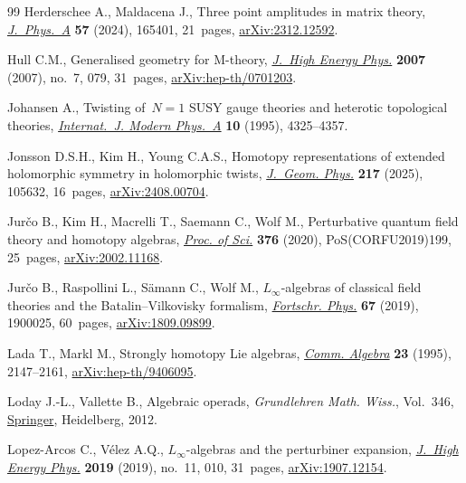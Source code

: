 \documentclass[10pt,a4paper]{amsart}
\numberwithin{equation}{section}
\theoremstyle{definition}
\begin{document}
\begin{thebibliography}{99}
Herderschee A., Maldacena J., Three point amplitudes in matrix theory,
 \href{https://doi.org/10.1088/1751-8121/ad389b}{\textit{J.~Phys.~A}}
 \textbf{57} (2024), 165401, 21~pages,
 \href{http://arxiv.org/abs/2312.12592}{arXiv:2312.12592}.

Hull C.M., Generalised geometry for {M}-theory,
 \href{https://doi.org/10.1088/1126-6708/2007/07/079}{\textit{J.~High Energy
 Phys.}} \textbf{2007} (2007), no.~7, 079, 31~pages,
 \href{http://arxiv.org/abs/hep-th/0701203}{arXiv:hep-th/0701203}.

Johansen A., Twisting of~{$N=1$} {SUSY} gauge theories and heterotic
 topological theories,
 \href{https://doi.org/10.1142/S0217751X9500200X}{\textit{Internat.~J. Modern
 Phys.~A}} \textbf{10} (1995), 4325--4357.

Jonsson D.S.H., Kim H., Young C.A.S., Homotopy representations of extended
 holomorphic symmetry in holomorphic twists,
 \href{https://doi.org/10.1016/j.geomphys.2025.105632}{\textit{J.~Geom.
 Phys.}} \textbf{217} (2025), 105632, 16~pages,
 \href{http://arxiv.org/abs/2408.00704}{arXiv:2408.00704}.

Jur\v{c}o B., Kim H., Macrelli T., Saemann C., Wolf M., Perturbative quantum
 field theory and homotopy algebras,
 \href{https://doi.org/10.22323/1.376.0199}{\textit{Proc. of Sci.}}
 \textbf{376} (2020), PoS(CORFU2019)199, 25~pages,
 \href{http://arxiv.org/abs/2002.11168}{arXiv:2002.11168}.

Jur\v{c}o B., Raspollini L., S\"amann C., Wolf M., {$L_\infty$}-algebras of
 classical field theories and the {B}atalin--{V}ilkovisky formalism,
 \href{https://doi.org/10.1002/prop.201900025}{\textit{Fortschr. Phys.}}
 \textbf{67} (2019), 1900025, 60~pages,
 \href{http://arxiv.org/abs/1809.09899}{arXiv:1809.09899}.

Lada T., Markl M., Strongly homotopy {L}ie algebras,
 \href{https://doi.org/10.1080/00927879508825335}{\textit{Comm. Algebra}}
 \textbf{23} (1995), 2147--2161,
 \href{http://arxiv.org/abs/hep-th/9406095}{arXiv:hep-th/9406095}.

Loday J.-L., Vallette B., Algebraic operads, \textit{Grundlehren Math. Wiss.},
 Vol.~346, \href{https://doi.org/10.1007/978-3-642-30362-3}{Springer},
 Heidelberg, 2012.

Lopez-Arcos C., V\'elez A.Q., {$L_\infty$}-algebras and the perturbiner
 expansion, \href{https://doi.org/10.1007/jhep11(2019)010}{\textit{J.~High
 Energy Phys.}} \textbf{2019} (2019), no.~11, 010, 31~pages,
 \href{http://arxiv.org/abs/1907.12154}{arXiv:1907.12154}.


\end{thebibliography}
\end{document}
